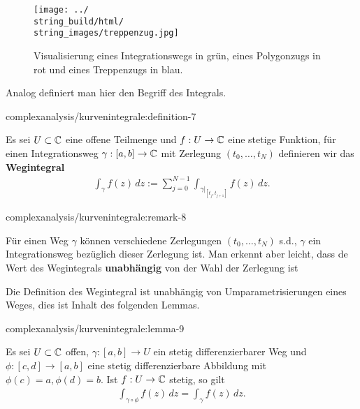 \begin{figure}[htbp]
\centering


\noindent\texttt{[image: ../\\string\_build/html/\\string\_images/treppenzug.jpg]}
\caption{Visualisierung eines Integrationswegs in grün, eines Polygonzugs in rot und eines Treppenzugs in blau.}\label{\detokenize{complexanalysis/kurvenintegrale:fig-treppenzug}}\end{figure}

\par
Analog definiert man hier den Begriff des Integrals.
\begin{definition}{}{complexanalysis/kurvenintegrale:definition-7}



\par
Es sei \(U\subset\mathbb{C}\) eine offene Teilmenge und \(f:U\to\mathbb{C}\) eine stetige Funktion, für einen Integrationsweg \(\gamma:[a,b]\to\mathbb{C}\) mit Zerlegung \((t_0,\ldots,t_N)\)  definieren wir das \textbf{Wegintegral}
\begin{align*}
\int_\gamma f(z)\, dz:= \sum_{j=0}^{N-1} \int_{\gamma\rvert_{[t_j,t_{j+1}]}} f(z)\,dz.
\end{align*}\end{definition}
\begin{remark}{}{complexanalysis/kurvenintegrale:remark-8}



\par
Für einen Weg \(\gamma\) können verschiedene Zerlegungen \((t_0,\ldots,t_N)\) s.d., \(\gamma\) ein Integrationsweg bezüglich dieser Zerlegung ist. Man erkennt aber leicht, dass de Wert des Wegintegrals \textbf{unabhängig} von der Wahl der Zerlegung ist
\end{remark}

\par
Die Definition des Wegintegral ist unabhängig von Umparametrisierungen eines Weges, dies ist Inhalt des folgenden Lemmas.
\begin{lemma}{}{complexanalysis/kurvenintegrale:lemma-9}



\par
Es sei \(U\subset\mathbb{C}\) offen, \(\gamma:[a,b]\to U\) ein stetig differenzierbarer Weg und \(\phi:[c,d]\to[a,b]\) eine stetig differenzierbare Abbildung mit \(\phi(c)=a,\phi(d)=b\). Ist \(f:U\to\mathbb{C}\) stetig, so gilt
\begin{align*}
\int_{\gamma\circ\phi} f(z)\, dz = \int_\gamma f(z)\, dz.
\end{align*}\end{lemma}

